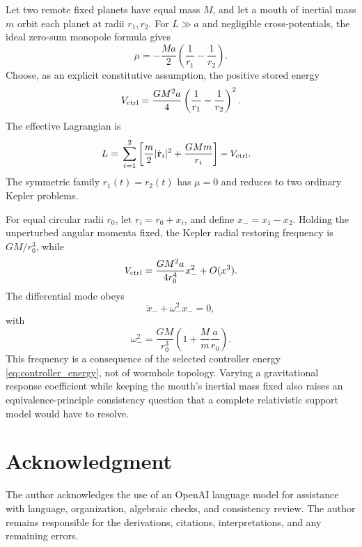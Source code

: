 \documentclass[journal,a4paper]{IEEEtran}
\begin{document}
Let two remote fixed planets have equal mass \(M\), and let a mouth of inertial mass \(m\) orbit each planet at radii \(r_1,r_2\). For \(L\gg a\) and negligible cross-potentials, the ideal zero-sum monopole formula gives
\begin{equation}
    \mu=-\frac{Ma}{2}
    \left(\frac{1}{r_1}-\frac{1}{r_2}\right).
\end{equation}
Choose, as an explicit constitutive assumption, the positive stored energy
\begin{equation}
    V_{\rm ctrl}
    =\frac{GM^2a}{4}
    \left(\frac{1}{r_1}-\frac{1}{r_2}\right)^2.
    \label{eq:controller_energy}
\end{equation}
The effective Lagrangian is
\begin{equation}
\begin{split}
L={}&\sum_{i=1}^2
\left[
\frac{m}{2}|\dot{\mathbf r}_i|^2
+\frac{GMm}{r_i}
\right]-V_{\rm ctrl}.
\end{split}
\end{equation}
The symmetric family \(r_1(t)=r_2(t)\) has \(\mu=0\) and reduces to two ordinary Kepler problems.

For equal circular radii \(r_0\), let \(r_i=r_0+x_i\), and define \(x_-=x_1-x_2\). Holding the unperturbed angular momenta fixed, the Kepler radial restoring frequency is \(GM/r_0^3\), while
\begin{equation}
    V_{\rm ctrl}
    =\frac{GM^2a}{4r_0^4}x_-^2+O(x^3).
\end{equation}
The differential mode obeys
\begin{equation}
    \ddot x_-+\omega_-^2x_-=0,
\end{equation}
with
\begin{equation}
    \boxed{
    \omega_-^2
    =\frac{GM}{r_0^3}
    \left(1+\frac{M}{m}\frac{a}{r_0}\right).
    }
\end{equation}
This frequency is a consequence of the selected controller energy \eqref{eq:controller_energy}, not of wormhole topology. Varying a gravitational response coefficient while keeping the mouth's inertial mass fixed also raises an equivalence-principle consistency question that a complete relativistic support model would have to resolve.

\section*{Acknowledgment}
The author acknowledges the use of an OpenAI language model for assistance with language, organization, algebraic checks, and consistency review. The author remains responsible for the derivations, citations, interpretations, and any remaining errors.
\end{document}
